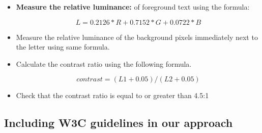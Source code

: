 \begin{itemize}
\item{\textbf{Measure the relative luminance:}} of foreground text using the formula:
\begin{figure}[!htb]
  \centering
\[ L = 0.2126 * R + 0.7152 * G + 0.0722 * B\]
\end{figure}

\item{}Measure the relative luminance of the background pixels immediately next to the letter using same formula.
\item{}Calculate the contrast ratio using the following formula.
\begin{figure}[!htb]
  \centering
\[ contrast = (L1 + 0.05) / (L2 + 0.05)\]
\end{figure}
\item{}Check that the contrast ratio is equal to or greater than 4.5:1
\end{itemize}




\subsection{Including W3C guidelines in our approach} %
\label{Including W3C guidelines}

